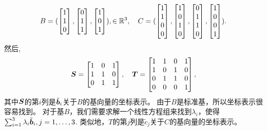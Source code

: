\begin{example}[基变换]
\begin{equation}
        B = (
            \begin{bmatrix} 1 \\ 1 \\ 0 \end{bmatrix},
            \begin{bmatrix} 0 \\ 1 \\ 1 \end{bmatrix},
            \begin{bmatrix} 1 \\ 0 \\ 1 \end{bmatrix}
        ), \in \R^3,
        \quad
        C = (
            \begin{bmatrix} 1 \\ 1 \\ 0 \\ 0 \end{bmatrix},
            \begin{bmatrix} 1 \\ 0 \\ 1 \\ 0 \end{bmatrix},
            \begin{bmatrix} 0 \\ 1 \\ 1 \\ 0 \end{bmatrix},
            \begin{bmatrix} 1 \\ 0 \\ 0 \\ 1 \end{bmatrix}
        ).
    \end{equation}
    然后,
    \begin{equation}
        \S =
        \begin{bmatrix}
            1 & 0 & 1 \\
            1 & 1 & 0 \\
            0 & 1 & 1
        \end{bmatrix}, \quad
        \T =
        \begin{bmatrix}
            1 & 1 & 0 & 1 \\
            1 & 0 & 1 & 0 \\
            0 & 1 & 1 & 0 \\
            0 & 0 & 0 & 1
        \end{bmatrix},
    \end{equation}
    其中$\S$的第$i$列是$\tilde{\b}_i$关于$B$的基向量的坐标表示。
    由于$B$是标准基，所以坐标表示很容易找到。
    对于基$B$，我们需要求解一个线性方程组来找到$\lambda_i$，使得
    $\sum_{i=1}^3 \lambda_i \tilde{\b}_i, j = 1,\dots, 3$.
    类似地，$T$的第$j$列是$\tilde{c}_j$关于$C$的基向量的坐标表示。


\end{example}
